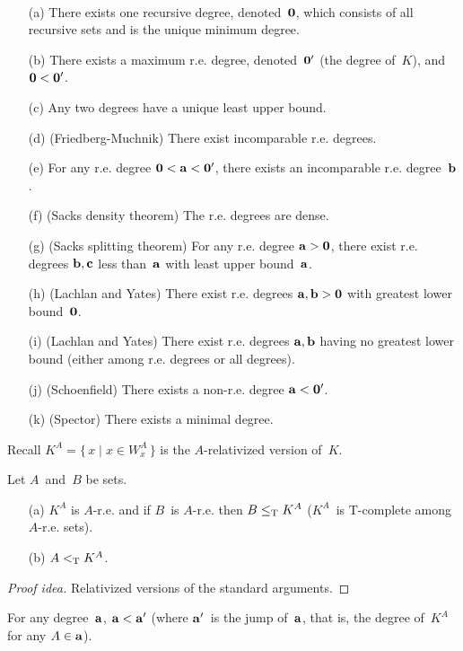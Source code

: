 \begin{thm}
\ 
\begin{enumerate}[itemsep=0pt]
\item[(a)] There exists one recursive degree, denoted~\(\mathbf{{0}}\), which consists of all recursive sets and is the unique minimum degree.
\item[(b)] There exists a maximum r.e. degree, denoted~\(\mathbf{{0}}'\) (the degree of~\(K\)), and \(\mathbf{{0}}<\mathbf{{0}}'\).
\item[(c)] Any two degrees have a unique least upper bound.
\item[(d)] (Friedberg-Muchnik) There exist incomparable r.e. degrees.
\item[(e)] For any r.e. degree \(\mathbf{{0}}<\mathbf{{a}}<\mathbf{{0}}'\), there exists an incomparable r.e. degree~\(\mathbf{{b}}\).
\item[(f)] (Sacks density theorem) The r.e. degrees are dense.
\item[(g)] (Sacks splitting theorem) For any r.e. degree \(\mathbf{{a}}>\mathbf{{0}}\), there exist r.e. degrees \(\mathbf{{b}},\mathbf{{c}}\) less than~\(\mathbf{{a}}\) with least upper bound~\(\mathbf{{a}}\).
\item[(h)] (Lachlan and Yates) There exist r.e. degrees \(\mathbf{{a}},\mathbf{{b}}>\mathbf{{0}}\) with greatest lower bound~\(\mathbf{{0}}\).
\item[(i)] (Lachlan and Yates) There exist r.e. degrees \(\mathbf{{a}},\mathbf{{b}}\) having no greatest lower bound (either among r.e. degrees or all degrees).
\item[(j)] (Schoenfield) There exists a non-r.e. degree \(\mathbf{{a}}<\mathbf{{0}}'\).
\item[(k)] (Spector) There exists a minimal degree.
\end{enumerate}
\end{thm}

\noindent Recall \(K^A=\{\,x\mid x\in W_x^A\,\}\) is the \(A\)-relativized version of~\(K\).

\begin{thm}
Let \(A\)~and~\(B\) be sets.
\begin{enumerate}[itemsep=0pt]
\item[(a)] \(K^A\) is \(A\)-r.e. and if \(B\)~is \(A\)-r.e. then \(B\mathrel{\le_{\mathrm{T}}} K^A\) (\(K^A\)~is T-complete among \(A\)-r.e. sets).
\item[(b)] \(A\mathrel{<_{\mathrm{T}}} K^A\).
\end{enumerate}
\end{thm}
\begin{proof}[Proof idea]
Relativized versions of the standard arguments.
\end{proof}

\begin{cor}
For any degree~\(\mathbf{{a}}\), \(\mathbf{{a}}<\mathbf{{a}}'\) (where \(\mathbf{{a}}'\)~is the jump of~\(\mathbf{{a}}\), that is, the degree of~\(K^A\) for any \(A\in\mathbf{{a}}\)).
\end{cor}